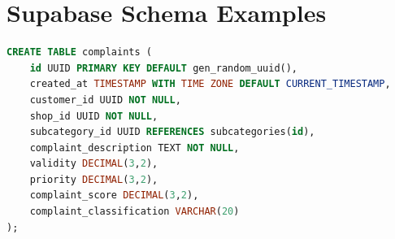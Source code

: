 \documentclass[12pt,a4paper,openany]{book}
\begin{document}
\chapter{Supabase Schema Examples}
\begin{lstlisting}[language=SQL,caption={Simplified complaint table schema}]
CREATE TABLE complaints (
    id UUID PRIMARY KEY DEFAULT gen_random_uuid(),
    created_at TIMESTAMP WITH TIME ZONE DEFAULT CURRENT_TIMESTAMP,
    customer_id UUID NOT NULL,
    shop_id UUID NOT NULL,
    subcategory_id UUID REFERENCES subcategories(id),
    complaint_description TEXT NOT NULL,
    validity DECIMAL(3,2),
    priority DECIMAL(3,2),
    complaint_score DECIMAL(3,2),
    complaint_classification VARCHAR(20)
);
\end{lstlisting}

\backmatter
\end{document}
